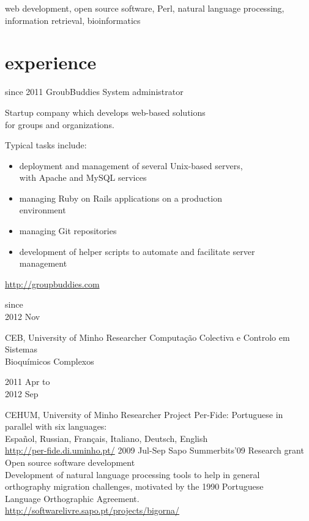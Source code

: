 \documentclass[a4paper]{friggeri-cv}
\begin{document}
{\large{web development, open source software, Perl, natural language
processing, information retrieval, bioinformatics}}

\section{experience}
\begin{entrylist}
  \entry
    {{\footnotesize since} 2011}
    {GroubBuddies}
    {System administrator}
    {
	Startup company which develops web-based solutions\\
	for groups and organizations. \footnotesize{Typical tasks include:
		\begin{itemize}
			\item deployment and management of several Unix-based
			servers,\\ 
			with Apache and MySQL services
			\item managing Ruby on Rails applications on a production\\
			environment
			\item managing Git repositories
			\item development of helper scripts to automate and
			facilitate server\\
			management
			\end{itemize}
		\url{http://groupbuddies.com}
		}
	}
  \entry
    {\parbox[t][][t]{1.8cm}{{\footnotesize since}\\2012 {\footnotesize
	Nov}}}
    {CEB, University of Minho}
    {Researcher}
    {Computação Colectiva e Controlo em Sistemas\\
	Bioquímicos Complexos}
  \entry
    {\parbox[t][][t]{1.8cm}{2011 {\footnotesize Apr to}\\2012 {\footnotesize Sep}}}
    {CEHUM, University of Minho}
    {Researcher}
    {Project Per-Fide: Portuguese in parallel with six languages:\\
	Español, Russian, Français, Italiano, Deutsch, English\\
	{\footnotesize
	\url{http://per-fide.di.uminho.pt/}
	}}
  \entry
    {2009 {\footnotesize Jul-Sep}}
    {Sapo Summerbits'09}
    {Research grant}
    {Open source software development\\
	\footnotesize{
	Development of natural language processing tools to help in general\\
	orthography migration challenges, motivated by the 1990 Portuguese\\
	Language Orthographic Agreement.\\
	\url{http://softwarelivre.sapo.pt/projects/bigorna/}}}
\end{entrylist}
\end{document}
